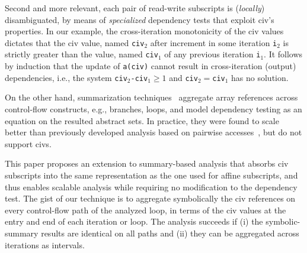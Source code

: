 \documentclass{sig-alternate}
\begin{document}
Second and more relevant, each pair of read-write subscripts is ({\em locally}) 
disambiguated, by means of {\em specialized} dependency tests that exploit
{\sc civ}'s properties. 
In our example, the cross-iteration monotonicity of the {\sc civ} values 
dictates that the {\sc civ} value, named {\tt civ$_2$} after increment 
in some iteration {\tt i$_2$} is strictly greater than the value,
named {\tt civ$_1$} of any previous iteration {\tt i$_1$}.
It follows by induction that the update of {\tt a(civ)}
cannot result in cross-iteration (output) dependencies, i.e.,
the system {\tt civ$_2$-civ$_1 \geq 1$} and {\tt civ$_2 = $civ$_1$}
has no solution. 

On the other hand, summarization techniques~\cite{SUIF,LMAD,CosPLDI} aggregate 
array references across control-flow constructs, e.g., branches, loops, and  
model dependency testing as an equation on the resulted abstract sets.
In practice, they were found to scale better than previously developed
analysis based on pairwise accesses~\cite{SUIF}, but do not support {\sc civ}s.

This paper proposes an extension to summary-based analysis %
that absorbs {\sc civ} subscripts into the same representation %
as the one used for affine subscripts, and thus enables scalable analysis
while requiring no modification to the dependency test. %
%
The gist of our technique is to aggregate symbolically the {\sc civ} 
references on every control-flow path of the analyzed loop, in terms
of the {\sc civ} values at the entry and end of each iteration or loop.
The analysis succeeds if (i) the symbolic-summary results are identical 
on all paths and (ii) they can be aggregated across iterations %
as intervals.
\end{document}
